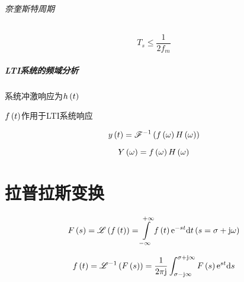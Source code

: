 \documentclass{article}
\begin{document}
\paragraph{奈奎斯特周期}

\[T_s\leqslant\frac1{2f_m}\]

\subsubsection{LTI系统的频域分析}

系统冲激响应为$h\left(t\right)$

$f\left(t\right)$作用于LTI系统响应

\[y\left(t\right)=\mathscr F^{-1}\left(f\left(\omega\right)H\left(\omega\right)\right)\]

\[Y\left(\omega\right)=f\left(\omega\right)H\left(\omega\right)\]

\part{拉普拉斯变换}

\[F\pare{s}=\laplace{\ft}=\impint\ft\e^{-st}\d t\pare{s=\sigma+\j\omega}\]

\[f\left(t\right)=\mathscr L^{-1}\left(F\left(s\right)\right)=\frac1{2\pi\mathrm j}\int_{\sigma-\mathrm j\infty}^{\sigma+\mathrm j\infty}F\left(s\right)\mathrm e^{st}\mathrm d s\]
\end{document}
